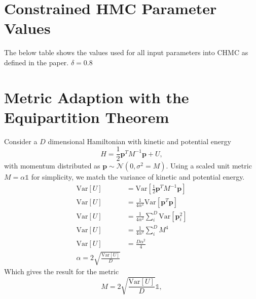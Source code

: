 \documentclass[11pt]{article}
\begin{document}
    \appendix
    \section{Constrained HMC Parameter Values}\label{sec:param_table}
    The below table shows the values used for all input parameters into CHMC as defined in the paper.
    $\delta = 0.8$~\cite{MCMChamiltonian}

    \section{Metric Adaption with the Equipartition Theorem}\label{sec:metric_derivation}
    Consider a $D$ dimensional Hamiltonian with kinetic and potential energy
    \begin{equation}\label{eq:hamiltonian}
        H = \frac{1}{2} \mathbf{p}^T M^{-1} \mathbf{p} + U,
    \end{equation}
    with momentum distributed as $\mathbf{p} \sim \mathcal{N}(0, \sigma^2 = M)$.
    Using a scaled unit metric $M = \alpha \mathbb{1}$ for simplicity, we match the variance of kinetic and potential energy.
    \begin{equation}\label{eq:var_matching}
    \begin{aligned}
        \mathrm{Var}[U] &= \mathrm{Var}\left[\frac{1}{2} \mathbf{p}^T M^{-1} \mathbf{p}\right]  \\
        \mathrm{Var}[U] &= \frac{1}{4 \alpha^2} \mathrm{Var}\left[\mathbf{p}^T \mathbf{p}\right] \\
        \mathrm{Var}[U] &= \frac{1}{4 \alpha^2} \sum_i^D{\mathrm{Var}[\mathbf{p}_i^2]} \\
        \mathrm{Var}[U] &= \frac{1}{4 \alpha^2} \sum_i^D{M^4} \\
        \mathrm{Var}[U] &= \frac{D \alpha^2}{4} \\
        \alpha = 2 \sqrt{\frac{\mathrm{Var}[U]}{D}}
    \end{aligned}
    \end{equation}
    Which gives the result for the metric
    \begin{equation}\label{eq:metric_adaption_appendix}
        M = 2 \sqrt{\frac{\mathrm{Var}[U]}{D}} \mathbb{1},
    \end{equation}
\end{document}
